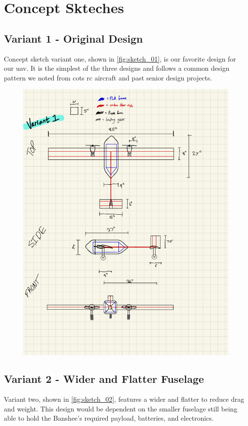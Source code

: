 \chapter{Concept Skteches}\label{cp:concept_sketches}

\section{Variant 1 - Original Design}

Concept sketch variant one, shown in \autoref{fig:sketch_01}, is our favorite design for our \acrshort{uav}. It is the simplest of the three designs and follows a common design pattern we noted from \acrshort{cots} \acrshort{rc} aircraft and past senior design projects.

\begin{figure}[htpb]
    \centering
    \includegraphics[width=0.7\linewidth]{Figures/aircraft_sketch_01.pdf}
    \caption[Concept sketch variant 1]{}
    \label{fig:sketch_01}
\end{figure}

\newpage

\section{Variant 2 - Wider and Flatter Fuselage}

Variant two, shown in \autoref{fig:sketch_02}, features a wider and flatter to reduce drag and weight. This design would be dependent on the smaller fuselage still being able to hold the Banshee's required payload, batteries, and electronics.

